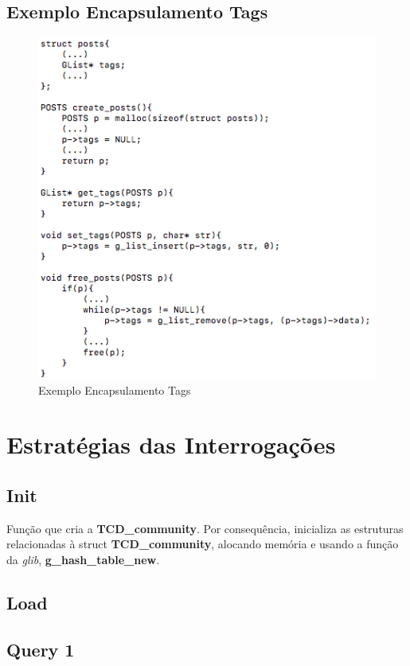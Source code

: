 \documentclass[a4paper]{article}
\begin{document}
\subsection{Exemplo Encapsulamento Tags}
\begin{figure}[ht]
\centering
\includegraphics[scale=0.50]{image_exemplo_encapsulamento}
\caption{Exemplo Encapsulamento Tags} 
\label{img:encapsulamento_posts}
\end{figure}

\section{Estratégias das Interrogações}
\label{sec:estrategias}

\subsection{Init}

Função que cria a \textbf{TCD\_community}. Por consequência, inicializa
as estruturas relacionadas à struct \textbf{TCD\_community}, alocando
memória e usando a função da \textit{glib}, \textbf{g\_hash\_table\_new}.

\subsection{Load}

\subsection{Query 1}
\end{document}

